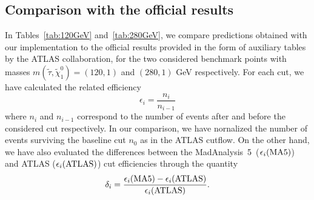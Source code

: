 \documentclass{ws-mpla}
\newcommand{\madanalysis}{{\sc MadAnalysis~5}}
\begin{document}
\subsection{Comparison with the official results}
In Tables~\ref{tab:120GeV} and~\ref{tab:280GeV}, we compare predictions obtained with our implementation to the official results provided in the form of auxiliary tables by the ATLAS collaboration, for the two considered benchmark points with masses $m(\tilde{\tau},\tilde{\chi}^0_1)=(120,1)$ and $(280,1)$ GeV respectively.
For each cut, we have calculated the related efficiency
\begin{equation}
\epsilon_i =\frac{n_i}{n_{i-1}}
\end{equation}
where $ n_i $ and $ n_{i-1} $ correspond to the number of events after and before the considered cut respectively.
In our comparison, we have nornalized the number of events surviving the baseline cut $n_0$ as in the ATLAS cutflow.
%
On the other hand, we have also evaluated the differences between the \madanalysis\ ($\epsilon_i ({\rm MA5})$) and ATLAS ($\epsilon_i ({\rm ATLAS})$) cut efficiencies through the quantity
\begin{equation}
\delta_i = \frac{\epsilon_i ({\rm MA5})-\epsilon_i ({\rm ATLAS})}{\epsilon_i ({\rm ATLAS})}.
\end{equation}
\end{document}
